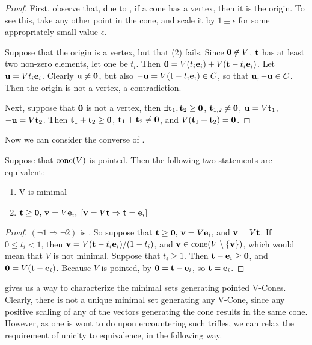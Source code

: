 \begin{proof}
	First, observe that, due to , if a cone has a vertex, then it is the origin.  To see this, take any other point in the cone, and scale it by $1 \pm \epsilon$ for some appropriately small value $\epsilon$.
  
  Suppose that the origin is a vertex, but that (2) fails.  Since $\mathbf{0}\not\in V$, $\mathbf{t}$ has at least two non-zero elements, let one be $t_i$.  Then $\mathbf{0} = V(t_i\mathbf{e}_i) + V(\mathbf{t}-t_i\mathbf{e}_i)$.  Let $\mathbf{u}=V t_i\mathbf{e}_i$.  Clearly $\mathbf{u}\neq\mathbf{0}$, but also $-\mathbf{u} = V(\mathbf{t}-t_i\mathbf{e}_i) \in C$, so that $\mathbf{u},-\mathbf{u}\in C$.  Then the origin is not a vertex, a contradiction.

	Next, suppose that $\mathbf{0}$ is not a vertex, then $\exists\mathbf{t}_1,\mathbf{t}_2\geq\mathbf{0}$, $\mathbf{t}_{1,2}\neq\mathbf{0}$, $\mathbf{u}=V\mathbf{t}_1$, $-\mathbf{u}=V\mathbf{t}_2$.  Then $\mathbf{t}_1+\mathbf{t}_2\geq\mathbf{0}$, $\mathbf{t}_1+\mathbf{t}_2\neq\mathbf{0}$, and $V(\mathbf{t}_1+\mathbf{t}_2)=\mathbf{0}$.
\end{proof}

Now we can consider the converse of .

\begin{Prop}\label{min_vcone_generators}
	Suppose that $\operatorname{cone}(V)$ is pointed.  Then the following two statements are equivalent:
	\begin{enumerate}
		\item V is minimal
		\item $\mathbf{t}\geq\mathbf{0},\,\mathbf{v}=V\mathbf{e}_i,\; [\mathbf{v}=V\mathbf{t} \Rightarrow \mathbf{t}=\mathbf{e}_i]$
	\end{enumerate}
\end{Prop}

\begin{proof}
	$(\neg 1 \Rightarrow \neg 2)$ is .  So suppose that $\mathbf{t}\geq\mathbf{0},\,\mathbf{v}=V\mathbf{e}_i$, and $\mathbf{v}=V\mathbf{t}$.  If $0\leq t_i < 1$, then $\mathbf{v} = V(\mathbf{t}-t_i\mathbf{e}_i)/(1-t_i)$, and $\mathbf{v}\in \operatorname{cone}(V\setminus\{\mathbf{v}\})$, which would mean that $V$ is not minimal.  Suppose that $t_i\geq 1$.  Then $\mathbf{t}-\mathbf{e}_i\geq\mathbf{0}$, and $\mathbf{0}=V(\mathbf{t}-\mathbf{e}_i)$.  Because $V$ is pointed, by  $\mathbf{0}=\mathbf{t}-\mathbf{e}_i$, so $\mathbf{t}=\mathbf{e}_i$.
\end{proof}

 gives us a way to characterize the minimal sets generating pointed V-Cones.  Clearly, there is not a unique minimal set generating any V-Cone, since any positive scaling of any of the vectors generating the cone results in the same cone.  However, as one is wont to do upon encountering such trifles, we can relax the requirement of unicity to equivalence, in the following way.

